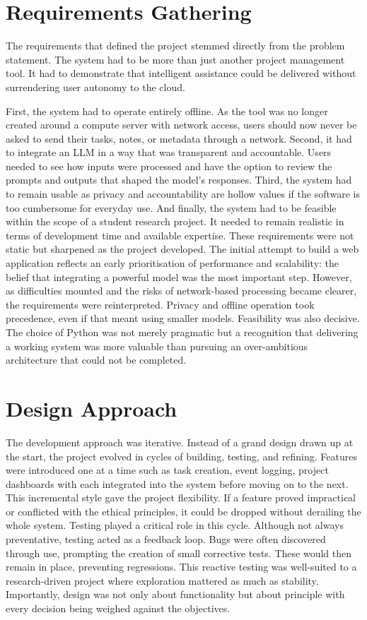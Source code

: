 \documentclass{report}
\begin{document}
\section{Requirements Gathering}

The requirements that defined the project stemmed directly from the problem statement. 
The system had to be more than just another project management tool. 
It had to demonstrate that intelligent assistance could be delivered without surrendering user autonomy to the cloud. 

First, the system had to operate entirely offline. As the tool was no longer created around a compute server with network access, users should now never be asked to send their tasks, notes, or metadata through a network. 
Second, it had to integrate an LLM in a way that was transparent and accountable. 
Users needed to see how inputs were processed and have the option to review the prompts and outputs that shaped the model's responses. 
Third, the system had to remain usable as privacy and accountability are hollow values if the software is too cumbersome for everyday use. 
And finally, the system had to be feasible within the scope of a student research project. It needed to remain realistic in terms of development time and available expertise.
These requirements were not static but sharpened as the project developed. The initial attempt to build a web application reflects an early prioritisation of performance and scalability: the belief that integrating a powerful model was the most important step. 
However, as difficulties mounted and the risks of network-based processing became clearer, the requirements were reinterpreted. 
Privacy and offline operation took precedence, even if that meant using smaller models. 
Feasibility was also decisive. The choice of Python was not merely pragmatic but a recognition that delivering a working system was more valuable than pursuing an over-ambitious architecture that could not be completed.

\section{Design Approach}

The development approach was iterative. 
Instead of a grand design drawn up at the start, the project evolved in cycles of building, testing, and refining. 
Features were introduced one at a time such as task creation, event logging, project dashboards with each integrated into the system before moving on to the next. 
This incremental style gave the project flexibility. 
If a feature proved impractical or conflicted with the ethical principles, it could be dropped without derailing the whole system.
Testing played a critical role in this cycle. Although not always preventative, testing acted as a feedback loop. 
Bugs were often discovered through use, prompting the creation of small corrective tests. 
These would then remain in place, preventing regressions. 
This reactive testing was well-suited to a research-driven project where exploration mattered as much as stability.
Importantly, design was not only about functionality but about principle with every decision being weighed against the objectives. 
\end{document}
